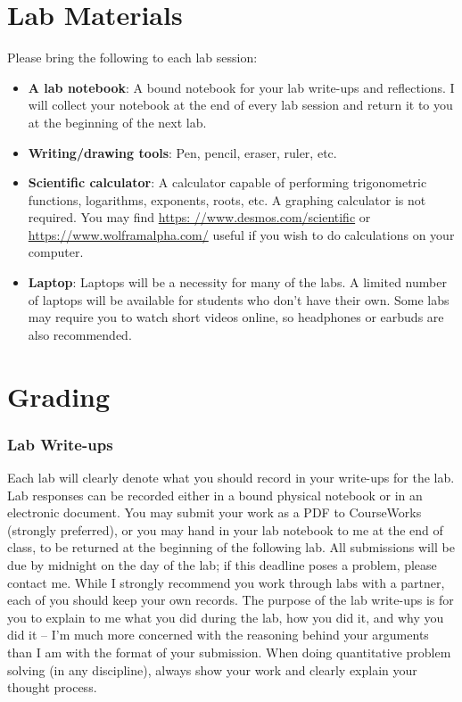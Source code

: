 \documentclass[10pt]{article}
\begin{document}
\section*{Lab Materials}
 
Please bring the following to each lab session:
 
\begin{itemize}
\item \textbf{A lab notebook}: A bound notebook for your lab write-ups and reflections. I will collect your notebook at the end of every lab session and return it to you at the beginning of the next lab. 
 
\item \textbf{Writing/drawing tools}: Pen, pencil, eraser, ruler, etc. 
 
\item \textbf{Scientific calculator}:  A calculator capable of performing trigonometric functions, logarithms, exponents, roots, etc. A graphing calculator is not required. You may find \url{https: //www.desmos.com/scientific} or \url{https://www.wolframalpha.com/} useful if you wish to do calculations on your computer.

\item \textbf{Laptop}: Laptops will be a necessity for many of the labs. A limited number of laptops will be available for students who don’t have their own. Some labs may require you to watch short videos online, so headphones or earbuds are also recommended.
 
\end{itemize}

\section*{Grading}
\subsubsection*{Lab Write-ups}
\noindent Each lab will clearly denote what you should record in your write-ups for the lab. Lab responses can be recorded either in a bound physical notebook or in an electronic document. You may submit your work as a PDF to CourseWorks (strongly preferred), or you may hand in your lab notebook to me at the end of class, to be returned at the beginning of the following lab. All submissions will be due by midnight on the day of the lab; if this deadline poses a problem, please contact me. While I strongly recommend you work through labs with a partner, each of you should keep your own records. The purpose of the lab write-ups is for you to explain to me what you did during the lab, how you did it, and why you did it – I’m much more concerned with the reasoning behind your arguments than I am with the format of your submission. When doing quantitative problem solving (in any discipline), always show your work and clearly explain your thought process.\\
\end{document}
